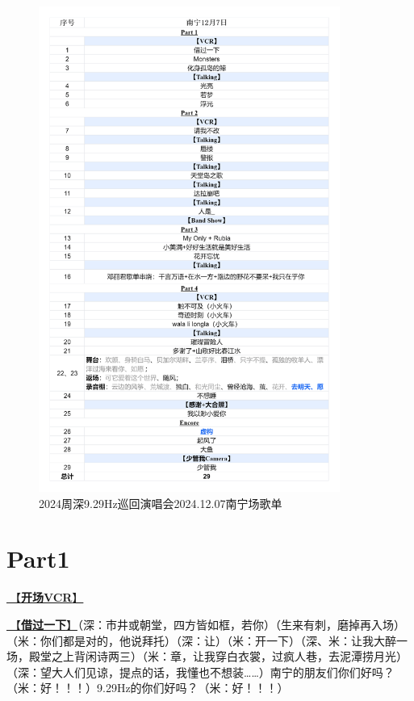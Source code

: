 \documentclass[]{ctexbook}
\begin{document}
\begin{figure}

{\centering \includegraphics[width=280pt]{img/playlists/playlists-nanning-20241207} 

}

\caption{2024周深9.29Hz巡回演唱会2024.12.07南宁场歌单}\label{fig:unnamed-chunk-162}
\end{figure}

\newpage

\section{Part1}\label{nanning-20241207-part1}

\hyperref[opening-vcr]{🎥【\textbf{开场VCR}】}

\hyperref[I-will-go-my-way]{🎵【\textbf{借过一下}】}（深：市井或朝堂，四方皆如框，若你）（生来有刺，磨掉再入场）（米：你们都是对的，他说拜托）（深：让）（米：开一下）（深、米：让我大醉一场，殿堂之上背闲诗两三）（米：章，让我穿白衣裳，过疯人巷，去泥潭捞月光）（深：望大人们见谅，提点的话，我懂也不想装\ldots\ldots）南宁的朋友们你们好吗？（米：好！！！）9.29Hz的你们好吗？（米：好！！！）
\end{document}
